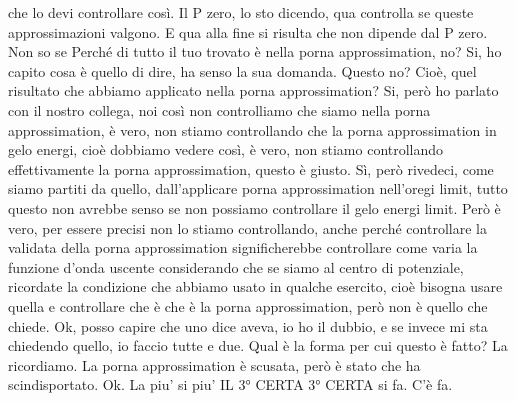 \begin{soluzione}
che lo devi controllare così. Il P zero, lo sto dicendo, qua controlla se queste approssimazioni valgono. E qua alla fine si risulta che non dipende dal P zero. Non so se Perché di tutto il tuo trovato è nella porna approssimation, no? Si, ho capito cosa è quello di dire, ha senso la sua domanda. Questo no? Cioè, quel risultato che abbiamo applicato nella porna approssimation? Si, però ho parlato con il nostro collega, noi così non controlliamo che siamo nella porna approssimation, è vero, non stiamo controllando che la porna approssimation in gelo energi, cioè dobbiamo vedere così, è vero, non stiamo controllando effettivamente la porna approssimation, questo è giusto. Sì, però rivedeci, come siamo partiti da quello, dall'applicare porna approssimation nell'oregi limit, tutto questo non avrebbe senso se non possiamo controllare il gelo energi limit. Però è vero, per essere precisi non lo stiamo controllando, anche perché controllare la validata della porna approssimation significherebbe controllare come varia la funzione d'onda uscente considerando che se siamo al centro di potenziale, ricordate la condizione che abbiamo usato in qualche esercito, cioè bisogna usare quella e controllare che è che è la porna approssimation, però non è quello che chiede. Ok, posso capire che uno dice aveva, io ho il dubbio, e se invece mi sta chiedendo quello, io faccio tutte e due. Qual è la forma per cui questo è fatto? La ricordiamo. La porna approssimation è scusata, però è stato che ha scindisportato. Ok. La piu' si piu' IL 3° CERTA 3° CERTA si fa. C'è fa. 
   

\end{soluzione}

